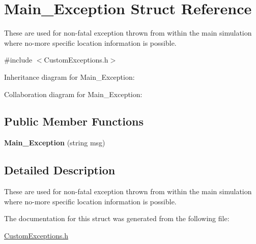 \hypertarget{struct_main___exception}{}\section{Main\+\_\+\+Exception Struct Reference}
\label{struct_main___exception}


These are used for non-\/fatal exception thrown from within the main simulation where no-\/more specific location information is possible.  




{\ttfamily \#include $<$Custom\+Exceptions.\+h$>$}



Inheritance diagram for Main\+\_\+\+Exception\+:


Collaboration diagram for Main\+\_\+\+Exception\+:
\subsection*{Public Member Functions}
\begin{DoxyCompactItemize}
\item 
{\bfseries Main\+\_\+\+Exception} (string msg)\hypertarget{struct_main___exception_a3b56c19b4513c6695cea80d90ca7da8f}{}\label{struct_main___exception_a3b56c19b4513c6695cea80d90ca7da8f}

\end{DoxyCompactItemize}


\subsection{Detailed Description}
These are used for non-\/fatal exception thrown from within the main simulation where no-\/more specific location information is possible. 

The documentation for this struct was generated from the following file\+:\begin{DoxyCompactItemize}
\item 
\hyperlink{_custom_exceptions_8h}{Custom\+Exceptions.\+h}\end{DoxyCompactItemize}
